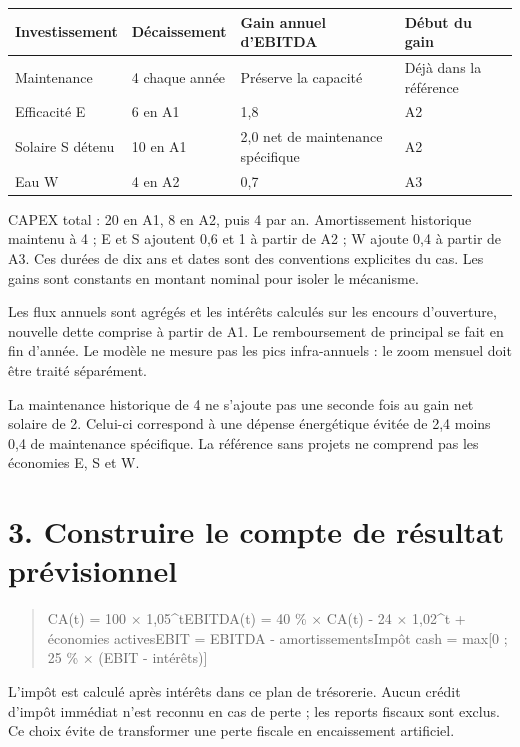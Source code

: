 \documentclass[12pt,a4paper]{article}
\begin{document}
\Needspace{215pt}
\begin{longtable}{p{3.67cm}p{3.67cm}p{3.67cm}p{3.67cm}}
\toprule
Investissement & Décaissement & Gain annuel d’EBITDA & Début du gain \\
\midrule\endhead
Maintenance & 4 chaque année & Préserve la capacité & Déjà dans la référence \\
Efficacité E & 6 en A1 & 1,8 & A2 \\
Solaire S détenu & 10 en A1 & 2,0 net de maintenance spécifique & A2 \\
Eau W & 4 en A2 & 0,7 & A3 \\
\bottomrule
\end{longtable}

CAPEX total : 20 en A1, 8 en A2, puis 4 par an. Amortissement historique maintenu à 4 ; E et S ajoutent 0,6 et 1 à partir de A2 ; W ajoute 0,4 à partir de A3. Ces durées de dix ans et dates sont des conventions explicites du cas. Les gains sont constants en montant nominal pour isoler le mécanisme.


Les flux annuels sont agrégés et les intérêts calculés sur les encours d’ouverture, nouvelle dette comprise à partir de A1. Le remboursement de principal se fait en fin d’année. Le modèle ne mesure pas les pics infra-annuels : le zoom mensuel doit être traité séparément.


La maintenance historique de 4 ne s’ajoute pas une seconde fois au gain net solaire de 2. Celui-ci correspond à une dépense énergétique évitée de 2,4 moins 0,4 de maintenance spécifique. La référence sans projets ne comprend pas les économies E, S et W.

\section*{3. Construire le compte de résultat prévisionnel}

\begin{quote}\small CA(t) = 100 $\times$ 1,05\textasciicircum{}t\newline EBITDA(t) = 40 \% $\times$ CA(t) - 24 $\times$ 1,02\textasciicircum{}t + économies actives\newline EBIT = EBITDA - amortissements\newline Impôt cash = max[0 ; 25 \% $\times$ (EBIT - intérêts)]\end{quote}

L’impôt est calculé après intérêts dans ce plan de trésorerie. Aucun crédit d’impôt immédiat n’est reconnu en cas de perte ; les reports fiscaux sont exclus. Ce choix évite de transformer une perte fiscale en encaissement artificiel.
\end{document}
